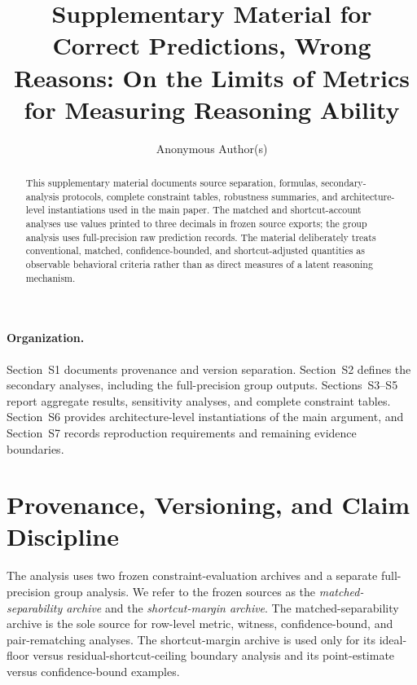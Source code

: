\documentclass[acmsmall,screen,review,anonymous]{acmart}
\begin{document}
\title{Supplementary Material for Correct Predictions, Wrong Reasons: On the
Limits of Metrics for Measuring Reasoning Ability}

\author{Anonymous Author(s)}

\begin{abstract}
This supplementary material documents source separation, formulas,
secondary-analysis protocols, complete constraint tables, robustness
summaries, and architecture-level instantiations used in the main paper.
The matched and shortcut-account analyses use values printed to three
decimals in frozen source exports; the group analysis uses full-precision raw
prediction records.
The material deliberately treats conventional, matched, confidence-bounded,
and shortcut-adjusted quantities as observable behavioral criteria rather
than as direct measures of a latent reasoning mechanism.
\end{abstract}


\maketitle

\paragraph{Organization.}
Section~S1 documents provenance and version separation. Section~S2 defines
the secondary analyses, including the full-precision group outputs.
Sections~S3--S5 report aggregate results, sensitivity analyses, and complete
constraint tables. Section~S6 provides architecture-level instantiations of
the main argument, and Section~S7 records reproduction requirements and
remaining evidence boundaries.

\section{Provenance, Versioning, and Claim Discipline}
\label{sec:supp-provenance}

The analysis uses two frozen constraint-evaluation archives and a separate
full-precision group analysis. We refer to the frozen sources as the
\emph{matched-separability archive} and the \emph{shortcut-margin archive}.
The matched-separability
archive is the sole source for row-level metric, witness, confidence-bound,
and pair-rematching analyses. The shortcut-margin archive is used only for
its ideal-floor versus residual-shortcut-ceiling boundary analysis and its
point-estimate versus confidence-bound examples.
\end{document}
